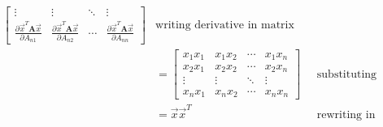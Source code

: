 \documentclass[11pt, fleqn]{article}
\newcommand{\pd}[2]{\frac{\partial #1}{\partial #2}}
\begin{document}
\begin{enumerate}
\begin{align*}
\begin{bmatrix}
            \vdots & \vdots & \ddots & \vdots \\
            \pd{\vec{x}^T \textbf{A} \vec{x}}{A_{n1}} & \pd{\vec{x}^T \textbf{A} \vec{x}}{A_{n2}} & \cdots & \pd{\vec{x}^T \textbf{A} \vec{x}}{A_{nn}}
        \end{bmatrix} & \text{writing derivative in matrix form} \\
        &= \begin{bmatrix}
            x_1 x_1 & x_1 x_2 & \cdots & x_1 x_n \\
            x_2 x_1 & x_2 x_2 & \cdots & x_2 x_n \\
            \vdots & \vdots & \ddots & \vdots \\
            x_n x_1 & x_n x_2 & \cdots & x_n x_n
        \end{bmatrix} & \text{substituting previous result} \\
        &= \vec{x} \vec{x}^T & \text{rewriting in vector form} \\
    \end{align*}
\end{enumerate}

\newpage
\end{document}
